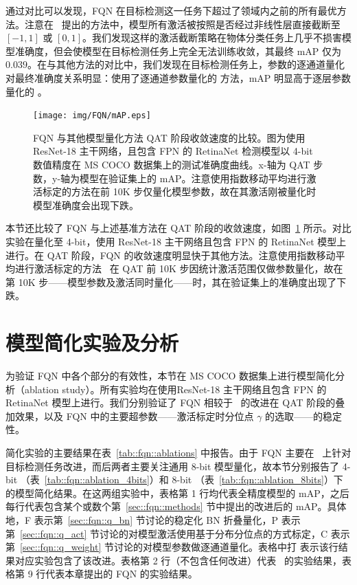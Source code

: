 \documentclass[
  fontset = mac,
]{shtthesis}
\begin{document}
通过对比可以发现，FQN 在目标检测这一任务下超过了领域内之前的所有最优方法。注意在~\citet{zhou2016dorefanet} 提出的方法中，模型所有激活被按照是否经过非线性层直接截断至 $[-1, 1]$ 或 $[0, 1]$。我们发现这样的激活截断策略在物体分类任务上几乎不损害模型准确度，但会使模型在目标检测任务上完全无法训练收敛，其最终 mAP 仅为 $0.039$。在与其他方法的对比中，我们发现在目标检测任务上，参数的逐通道量化对最终准确度关系明显：使用了逐通道参数量化的 \citet{krishnamoorthi2018quantizing, rastegari2016xnor} 方法，mAP 明显高于逐层参数量化的 \citet{jacob2018quantization}。

\begin{figure}[htb]
  \centering
  \texttt{[image: img/FQN/mAP.eps]}
  \caption{FQN 与其他模型量化方法 QAT 阶段收敛速度的比较。图为使用 ResNet-18 主干网络，且包含 FPN 的 RetinaNet 检测模型以 4-bit 数值精度在 MS COCO 数据集上的测试准确度曲线。x-轴为 QAT 步数，y-轴为模型在验证集上的 mAP。注意使用指数移动平均进行激活标定的方法在前 10K 步仅量化模型参数，故在其激活刚被量化时模型准确度会出现下跌。}
  \label{fig::fqn::convergence}
\end{figure}

本节还比较了 FQN 与上述基准方法在 QAT 阶段的收敛速度，如图~\ref{fig::fqn::convergence} 所示。对比实验在量化至 4-bit，使用 ResNet-18 主干网络且包含 FPN 的 RetinaNet 模型上进行。在 QAT 阶段，FQN 的收敛速度明显快于其他方法。注意使用指数移动平均进行激活标定的方法~\citep{jacob2018quantization, krishnamoorthi2018quantizing, rastegari2016xnor} 在 QAT 前 10K 步因统计激活范围仅做参数量化，故在第 10K 步——模型参数及激活同时量化——时，其在验证集上的准确度出现了下跌。
\section{模型简化实验及分析} \label{sec::fqn::analysis}
为验证 FQN 中各个部分的有效性，本节在 MS COCO 数据集上进行模型简化分析（ablation study）。所有实验均在使用ResNet-18 主干网络且包含 FPN 的 RetinaNet 模型上进行。我们分别验证了 FQN 相较于~\citet{jacob2018quantization, krishnamoorthi2018quantizing} 的改进在 QAT 阶段的叠加效果，以及 FQN 中的主要超参数——激活标定时分位点 $\gamma$ 的选取——的稳定性。 

简化实验的主要结果在表~\ref{tab::fqn::ablations} 中报告。由于 FQN 主要在~\citet{jacob2018quantization, krishnamoorthi2018quantizing} 上针对目标检测任务改进，而后两者主要关注通用 8-bit 模型量化，故本节分别报告了 4-bit （表~\ref{tab::fqn::ablation_4bits}）和 8-bit （表~\ref{tab::fqn::ablation_8bits}）下的模型简化结果。在这两组实验中，表格第 1 行均代表全精度模型的 mAP，之后每行代表包含某个或数个第~\ref{sec::fqn::methods} 节中提出的改进后的 mAP。具体地，F 表示第~\ref{sec::fqn::q_bn} 节讨论的稳定化 BN 折叠量化，P 表示第~\ref{sec::fqn::q_act} 节讨论的对模型激活使用基于分布分位点的方式标定，C 表示第~\ref{sec::fqn::q_weight} 节讨论的对模型参数做逐通道量化。表格中打 \checkmark 表示该行结果对应实验包含了该改进。表格第 2 行（不包含任何改进）代表~\citet{jacob2018quantization} 的实验结果，表格第 9 行代表本章提出的 FQN 的实验结果。
\end{document}
